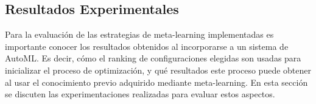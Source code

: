%	
%	
%
%
%
%

\subsection{Resultados Experimentales}\label{subsec:resultados}

%
%


Para la evaluación de las estrategias de meta-learning implementadas es importante conocer los resultados obtenidos al incorporarse a un sistema de AutoML. Es decir, cómo el ranking de configuraciones elegidas son usadas para inicializar el proceso de optimización, y qué resultados este proceso puede obtener al usar el conocimiento previo adquirido mediante meta-learning. En esta sección se discuten las experimentaciones realizadas para evaluar estos aspectos.

